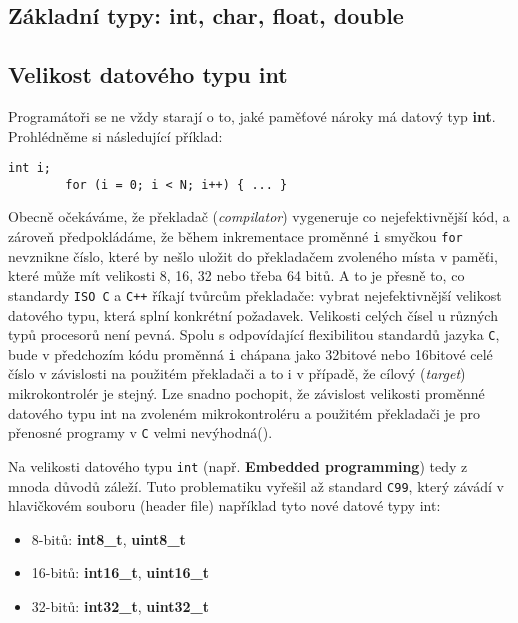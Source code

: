     \subsection{Základní typy: int, char, float, double}
    \subsection{Velikost datového typu int}
      Programátoři se ne vždy starají o to, jaké paměťové nároky má datový typ \textbf{int}. 
      Prohlédněme si následující příklad:
      \begin{lstlisting}[style=luaCStyle]
        int i;         
        for (i = 0; i < N; i++) { ... } 
      \end{lstlisting}
      Obecně očekáváme, že překladač (\emph{compilator}) vygeneruje co nejefektivnější kód, a 
      zároveň předpokládáme, že během inkrementace proměnné \texttt{i} smyčkou 
      \lstinline[style=luaCStyle]!for! nevznikne číslo, které by nešlo uložit do překladačem 
      zvoleného místa v paměťi, které může mít velikosti 8, 16, 32 nebo třeba 64 bitů. A to je 
      přesně to, co standardy \texttt{ISO C} a  \texttt{C++} říkají tvůrcům překladače: vybrat 
      nejefektivnější velikost datového typu, která splní konkrétní požadavek. Velikosti celých 
      čísel u různých typů procesorů není pevná. Spolu s odpovídající flexibilitou standardů jazyka 
      \texttt{C}, bude v předchozím kódu proměnná \texttt{i} chápana jako 32bitové nebo 16bitové 
      celé číslo v závislosti na použitém překladači a to i v případě, že cílový (\emph{target}) 
      mikrokontrolér je stejný. Lze snadno pochopit, že závislost velikosti proměnné datového typu 
      int na zvoleném mikrokontroléru a použitém překladači je pro přenosné programy v \texttt{C} 
      velmi nevýhodná(\cite[s.~29]{Barr2009}).
      
      Na velikosti datového typu \texttt{int} (např. \textbf{Embedded programming}) tedy z mnoda 
      důvodů záleží. Tuto problematiku vyřešil až standard \texttt{C99}, který závádí v hlavičkovém 
      souboru (header file) \wikiSTDINT například tyto nové datové typy int: 
      \begin{itemize}[noitemsep]
        \item  8-bitů: \textbf{int8\_t},  \textbf{uint8\_t}
        \item 16-bitů: \textbf{int16\_t}, \textbf{uint16\_t}
        \item 32-bitů: \textbf{int32\_t}, \textbf{uint32\_t}
      \end{itemize}


